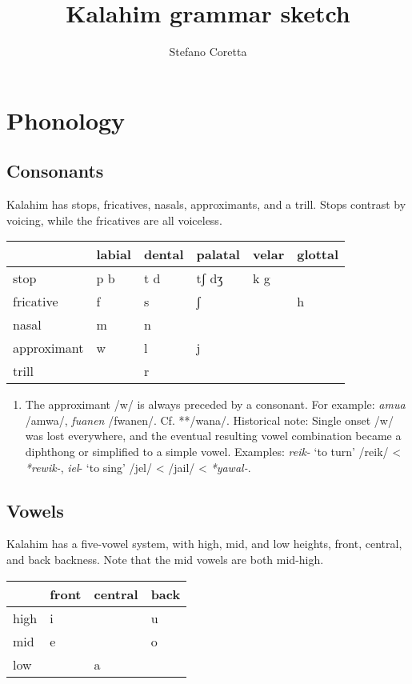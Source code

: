 \documentclass[a4paper,]{article}
\title{Kalahim grammar sketch}
\author{Stefano Coretta}
\date{}
\providecommand{\tightlist}{%
  \setlength{\itemsep}{0pt}\setlength{\parskip}{0pt}}
\begin{document}
\maketitle

\hypertarget{phonology}{%
\section{Phonology}\label{phonology}}

\hypertarget{consonants}{%
\subsection{Consonants}\label{consonants}}

Kalahim has stops, fricatives, nasals, approximants, and a trill. Stops
contrast by voicing, while the fricatives are all voiceless.

\begin{longtable}[]{@{}llllll@{}}
\toprule
& labial & dental & palatal & velar & glottal\tabularnewline
\midrule
\endhead
stop & p b & t d & tʃ dʒ & k g &\tabularnewline
fricative & f & s & ʃ & & h\tabularnewline
nasal & m & n & & &\tabularnewline
approximant & w & l & j & &\tabularnewline
trill & & r & & &\tabularnewline
\bottomrule
\end{longtable}

\begin{enumerate}
\def\labelenumi{\arabic{enumi}.}
\tightlist
\item
  The approximant /w/ is always preceded by a consonant. For example:
  \emph{amua} /amwa/, \emph{fuanen} /fwanen/. Cf. **/wana/. Historical
  note: Single onset /w/ was lost everywhere, and the eventual resulting
  vowel combination became a diphthong or simplified to a simple vowel.
  Examples: \emph{reik-} `to turn' /reik/ \textless{} \emph{*rewik-},
  \emph{iel}- `to sing' /jel/ \textless{} /jail/ \textless{}
  \emph{*yawal-}.
\end{enumerate}

\hypertarget{vowels}{%
\subsection{Vowels}\label{vowels}}

Kalahim has a five-vowel system, with high, mid, and low heights, front,
central, and back backness. Note that the mid vowels are both mid-high.

\begin{longtable}[]{@{}llll@{}}
\toprule
& front & central & back\tabularnewline
\midrule
\endhead
high & i & & u\tabularnewline
mid & e & & o\tabularnewline
low & & a &\tabularnewline
\bottomrule
\end{longtable}
\end{document}
